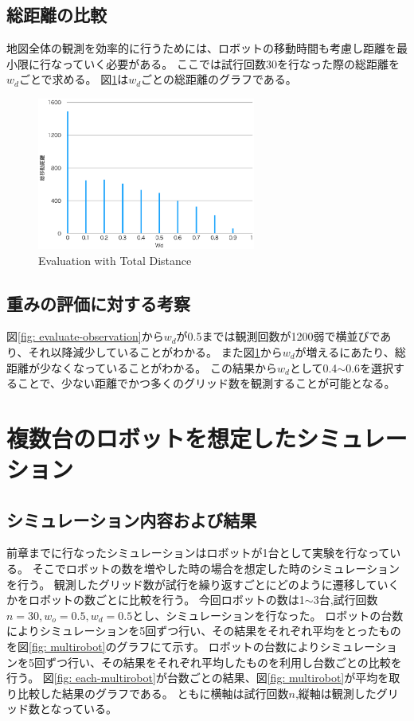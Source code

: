\documentclass{jsarticle}
\begin{document}
\subsection{総距離の比較}
\label{evaluate-distance}
地図全体の観測を効率的に行うためには、ロボットの移動時間も考慮し距離を最小限に行なっていく必要がある。
ここでは試行回数30を行なった際の総距離を$w_d$ごとで求める。
図\ref{fig: evaluate-distance}は$w_d$ごとの総距離のグラフである。


\begin{figure}[tbh]
 \centering
  \includegraphics[height=50mm]{fig/evaluate-distance.eps}
  \vspace*{-4mm}
  \caption{Evaluation with Total Distance}
  \label{fig: evaluate-distance}
\end{figure}

\subsection{重みの評価に対する考察}
図\ref{fig: evaluate-observation}から$w_d$が0.5までは観測回数が1200弱で横並びであり、それ以降減少していることがわかる。
また図\ref{fig: evaluate-distance}から$w_d$が増えるにあたり、総距離が少なくなっていることがわかる。
この結果から$w_d$として0.4$\sim$0.6を選択することで、少ない距離でかつ多くのグリッド数を観測することが可能となる。

\section{複数台のロボットを想定したシミュレーション}
\subsection{シミュレーション内容および結果}

前章までに行なったシミュレーションはロボットが1台として実験を行なっている。
そこでロボットの数を増やした時の場合を想定した時のシミュレーションを行う。
観測したグリッド数が試行を繰り返すごとにどのように遷移していくかをロボットの数ごとに比較を行う。
今回ロボットの数は1$\sim$3台,試行回数$n=30,w_o=0.5,w_d=0.5$とし、シミュレーションを行なった。
ロボットの台数によりシミュレーションを5回ずつ行い、その結果をそれぞれ平均をとったものを図\ref{fig: multirobot}のグラフにて示す。
ロボットの台数によりシミュレーションを5回ずつ行い、その結果をそれぞれ平均したものを利用し台数ごとの比較を行う。
図\ref{fig: each-multirobot}が台数ごとの結果、図\ref{fig: multirobot}が平均を取り比較した結果のグラフである。
ともに横軸は試行回数$n$,縦軸は観測したグリッド数となっている。
\end{document}
